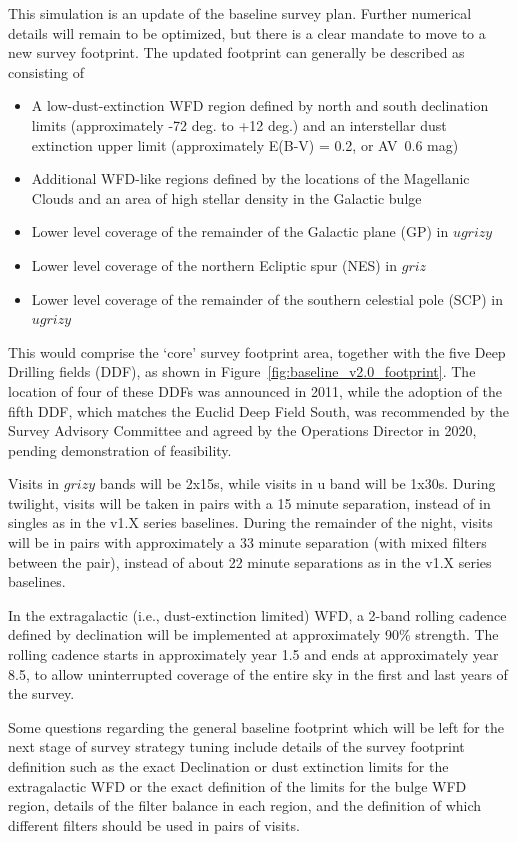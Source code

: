 This simulation is an update of the baseline survey plan. Further numerical details will remain to be optimized, but there is a clear mandate to move to a new survey footprint. The updated footprint can generally be described as consisting of 
\begin{itemize}
\item A low-dust-extinction WFD region defined by north and south declination limits (approximately -72 deg. to +12 deg.) and an interstellar dust extinction upper limit (approximately E(B-V) = 0.2, or AV~0.6 mag)
\item Additional WFD-like regions defined by the locations of the Magellanic Clouds and an area of high stellar density in the Galactic bulge 
\item Lower level coverage of the remainder of the Galactic plane (GP) in $ugrizy$
\item Lower level coverage of the northern Ecliptic spur (NES) in $griz$ 
\item Lower level coverage of the remainder of the southern celestial pole (SCP) in $ugrizy$
\end{itemize}
This would comprise the ‘core’ survey footprint area, together with the five Deep Drilling fields (DDF), as shown in Figure~\ref{fig:baseline_v2.0_footprint}. The location of four of these DDFs was announced in 2011, while the adoption of the fifth DDF, which matches the Euclid Deep Field South, was recommended by the Survey Advisory Committee and agreed by the Operations Director in 2020, pending demonstration of feasibility. 

Visits in $grizy$ bands will be 2x15s, while visits in u band will be 1x30s. During twilight, visits will be taken in pairs with a 15 minute separation, instead of in singles as in the v1.X series baselines. During the remainder of the night, visits will be in pairs with approximately a 33 minute separation (with mixed filters between the pair), instead of about 22 minute separations as in the v1.X series baselines.

In the extragalactic (i.e., dust-extinction limited) WFD, a 2-band rolling cadence defined by declination will be implemented at approximately 90\% strength. The rolling cadence starts in approximately year 1.5 and ends at approximately year 8.5, to allow uninterrupted coverage of the entire sky in the first and last years of the survey. 

Some questions regarding the general baseline footprint which will be left for the next stage of survey strategy tuning include details of the survey footprint definition such as the exact Declination or dust extinction limits for the extragalactic WFD or the exact definition of the limits for the bulge WFD region, details of the filter balance in each region, and the definition of which different filters should be used in pairs of visits.


